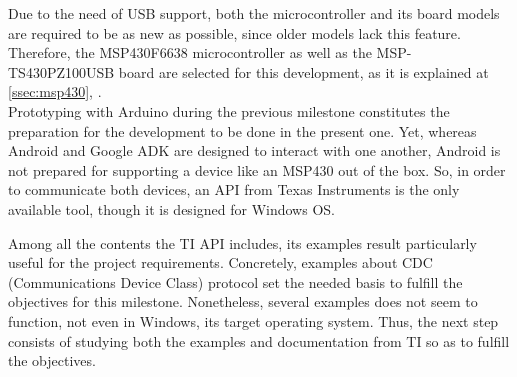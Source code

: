 		\begin{comment}
		Unlike the arduino's part where we know what we have to use and how we wil use it, now we found 
		that we just have an Texas Instruments(TI) API to comunicate the MSP430 with windows and our goal. 
		Both MSP430 microcontroller and MSP430 board was new devices because all the existing ones have no 
		USB port, the microcontroller is an MSP430 6638 and the board is a TS430PZ100USB(link to the MSP430 section).\\
		\end{comment}
		
		Due to the need of USB support, both the microcontroller and its board models are required to be
		as new as possible, since older models lack this feature. Therefore, the MSP430F6638 microcontroller
		as well as the MSP-TS430PZ100USB board are selected for this development, as it is explained at
		\autoref{ssec:msp430}, .\\
		
		Prototyping with Arduino during the previous milestone constitutes the preparation for the development
		to be done in the present one. Yet, whereas Android and Google ADK are designed to interact with
		one another, Android is not prepared for supporting a device like an MSP430 out of the box. So, in order to
		communicate both devices, an API from Texas Instruments \cite{TIUSB} is the only available tool, though
		it is designed for Windows OS.\\
		
		\begin{comment}
		Initialy in order to test the TI API we check some of the multiple examples, in our case was the 
		CDC examples that be usefull to learn about basic concepts of what we try to do. Also we try to 
		read part of the generic(not dependant of the MSP430 device nor USB protocol)documentation that 
		TI provides. And it didn't start too good, the first test with a example provide in the API didn't 
		work in windows, its target SO.
		\end{comment}
		
		Among all the contents the TI API includes, its examples result particularly useful for the project
		requirements. Concretely, examples about CDC (Communications Device Class) protocol set the needed
		basis to fulfill the objectives for this milestone. Nonetheless, several examples does not seem to
		function, not even in Windows, its target operating system. Thus, the next step consists of studying
		both the examples and documentation from TI so as to fulfill the objectives.
		
